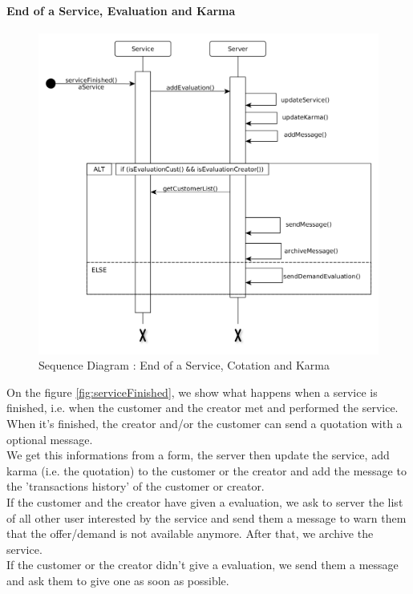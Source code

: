 \paragraph{End of a Service, Evaluation and Karma}

\begin{figure}[H]
	\begin{center}
		\includegraphics[width=.9\textwidth]{seq_serviceFinished.png}
		\caption{Sequence Diagram : End of a Service, Cotation and Karma}
		\label{fig:serviceFinished}
	\end{center}
\end{figure}

On the figure \vref{fig:serviceFinished}, we show what happens when a service is finished, i.e. when the customer and the creator met and performed the service.
\\ When it's finished, the creator and/or the customer can send a quotation with a optional message. 
\\ We get this informations from a form, the server then update the service, add karma (i.e. the quotation) to the customer or the creator and add the message to the 'transactions history' of the customer or creator.
\\ If the customer and the creator have given a evaluation, we ask to server the list of all other user interested by the service and send them a message to warn them that the offer/demand is not available anymore. After that, we archive the service.
\\ If the customer or the creator didn't give a evaluation, we send them a message and ask them to give one as soon as possible.


